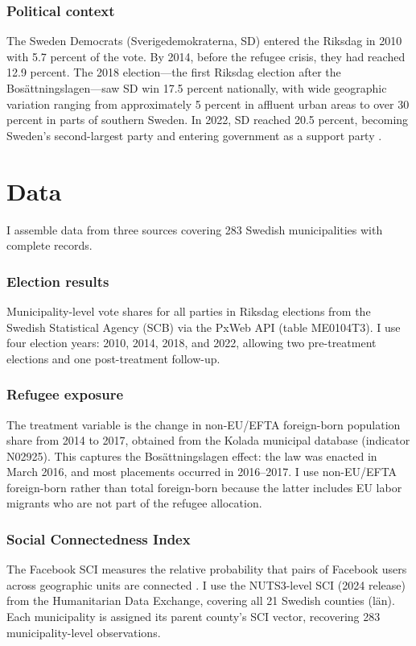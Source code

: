 \documentclass[12pt]{article}
\begin{document}
\subsubsection*{Political context} The Sweden Democrats (Sverigedemokraterna, SD) entered the Riksdag in 2010 with 5.7 percent of the vote. By 2014, before the refugee crisis, they had reached 12.9 percent. The 2018 election---the first Riksdag election after the Bos\"{a}ttningslagen---saw SD win 17.5 percent nationally, with wide geographic variation ranging from approximately 5 percent in affluent urban areas to over 30 percent in parts of southern Sweden. In 2022, SD reached 20.5 percent, becoming Sweden's second-largest party and entering government as a support party \citep{rydgren2018radical}.


\section{Data}

I assemble data from three sources covering 283 Swedish municipalities with complete records.

\subsubsection*{Election results} Municipality-level vote shares for all parties in Riksdag elections from the Swedish Statistical Agency (SCB) via the PxWeb API (table ME0104T3). I use four election years: 2010, 2014, 2018, and 2022, allowing two pre-treatment elections and one post-treatment follow-up.

\subsubsection*{Refugee exposure} The treatment variable is the change in non-EU/EFTA foreign-born population share from 2014 to 2017, obtained from the Kolada municipal database (indicator N02925). This captures the Bos\"{a}ttningslagen effect: the law was enacted in March 2016, and most placements occurred in 2016--2017. I use non-EU/EFTA foreign-born rather than total foreign-born because the latter includes EU labor migrants who are not part of the refugee allocation.

\subsubsection*{Social Connectedness Index} The Facebook SCI measures the relative probability that pairs of Facebook users across geographic units are connected \citep{bailey2018social}. I use the NUTS3-level SCI (2024 release) from the Humanitarian Data Exchange, covering all 21 Swedish counties (l\"{a}n). Each municipality is assigned its parent county's SCI vector, recovering 283 municipality-level observations.
\end{document}
